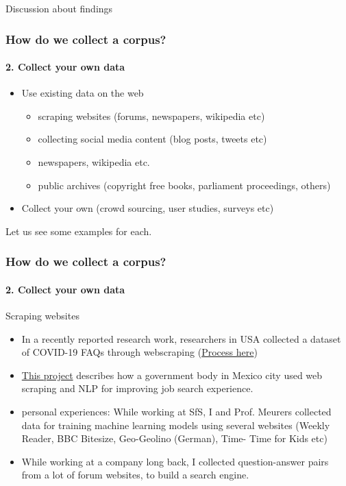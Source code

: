 \documentclass{beamer}
\begin{document}
\begin{frame}{Discussion about findings}
    
\end{frame}

\begin{frame}
\frametitle{How do we collect a corpus?}
\framesubtitle{2. Collect your own data}
\begin{itemize}
\item Use existing data on the web
\begin{itemize}
\item scraping websites (forums, newspapers, wikipedia etc)
\item collecting social media content (blog posts, tweets etc)
\item newspapers, wikipedia etc. 
\item public archives (copyright free books, parliament proceedings, others)
\end{itemize}
\item Collect your own (crowd sourcing, user studies, surveys etc)
\end{itemize}
Let us see some examples for each. 
\end{frame}

\begin{frame}
\frametitle{How do we collect a corpus?}
\framesubtitle{2. Collect your own data}
Scraping websites
\begin{itemize}
    \item In a recently reported research work, researchers in USA collected a dataset of COVID-19 FAQs through webscraping (\href{https://www.aclweb.org/anthology/2020.nlpcovid19-2.31.pdf}{Process here}) \pause
    \item \href{https://www.aclweb.org/anthology/2020.lt4gov-1.3/}{This project} describes how a government body in Mexico city used web scraping and NLP for improving job search experience. 
  \pause  \item personal experiences:  While working at SfS, I and Prof. Meurers collected data for training machine learning models using several websites (Weekly Reader, BBC Bitesize, Geo-Geolino (German), Time- Time for Kids etc) \pause
    \item While working at a company long back, I collected question-answer pairs from a lot of forum websites, to build a search engine. 
\end{itemize}
\end{frame}
\end{document}
